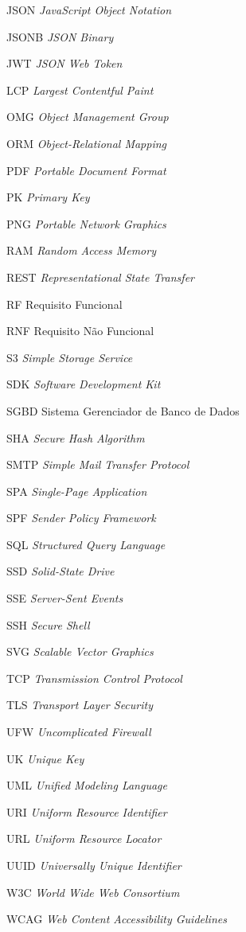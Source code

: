 \begin{siglas}
	\item[JSON] \textit{JavaScript Object Notation}
	\item[JSONB] \textit{JSON Binary}
	\item[JWT] \textit{JSON Web Token}
	\item[LCP] \textit{Largest Contentful Paint}
	\item[OMG] \textit{Object Management Group}
	\item[ORM] \textit{Object-Relational Mapping}
	\item[PDF] \textit{Portable Document Format}
	\item[PK] \textit{Primary Key}
	\item[PNG] \textit{Portable Network Graphics}
	\item[RAM] \textit{Random Access Memory}
	\item[REST] \textit{Representational State Transfer}
	\item[RF] Requisito Funcional
	\item[RNF] Requisito Não Funcional
	\item[S3] \textit{Simple Storage Service}
	\item[SDK] \textit{Software Development Kit}
	\item[SGBD] Sistema Gerenciador de Banco de Dados
	\item[SHA] \textit{Secure Hash Algorithm}
	\item[SMTP] \textit{Simple Mail Transfer Protocol}
	\item[SPA] \textit{Single-Page Application}
	\item[SPF] \textit{Sender Policy Framework}
	\item[SQL] \textit{Structured Query Language}
	\item[SSD] \textit{Solid-State Drive}
	\item[SSE] \textit{Server-Sent Events}
	\item[SSH] \textit{Secure Shell}
	\item[SVG] \textit{Scalable Vector Graphics}
	\item[TCP] \textit{Transmission Control Protocol}
	\item[TLS] \textit{Transport Layer Security}
	\item[UFW] \textit{Uncomplicated Firewall}
	\item[UK] \textit{Unique Key}
	\item[UML] \textit{Unified Modeling Language}
	\item[URI] \textit{Uniform Resource Identifier}
	\item[URL] \textit{Uniform Resource Locator}
	\item[UUID] \textit{Universally Unique Identifier}
	\item[W3C] \textit{World Wide Web Consortium}
	\item[WCAG] \textit{Web Content Accessibility Guidelines}
\end{siglas}
